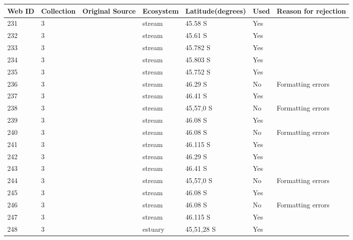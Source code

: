 \documentclass[12pt]{article}
\begin{document}
\begin{landscape}
        \newpage

    \begin{table}[h!]
    \centering
    {\footnotesize
      \begin{tabular}{p{2.8cm}p{1.3cm}p{3cm}p{2.2cm}p{2.5cm}lp{8.2cm}}
        \hline
        Web ID & Collection & Original Source & Ecosystem & Latitude(degrees) & Used  & Reason for rejection  \\
        \hline
        231   & 3 & \cite{Thompson2004c}  & stream & 45.58 S & Yes   &       \\
        232   & 3 & \cite{Thompson2004c}  & stream & 45.61 S & Yes   &       \\
        233   & 3 & \cite{Thompson2004c}  & stream & 45.782 S & Yes   &       \\
        234   & 3 & \cite{Thompson2004c}  & stream & 45.803 S & Yes   &       \\
        235   & 3 & \cite{Thompson2004c}  & stream & 45.752 S & Yes   &       \\
        236   & 3 & \cite{Thompson2004c}  & stream & 46.29 S & No  &  Formatting errors     \\
        237   & 3 & \cite{Thompson2004c}  & stream & 46.41 S & Yes   &       \\
        238   & 3 & \cite{Thompson2004c}  & stream & 45,57,0 S & No  &  Formatting errors     \\
        239   & 3 & \cite{Thompson2004c}  & stream & 46.08 S & Yes   &       \\
        240   & 3 & \cite{Thompson2004c}  & stream & 46.08 S & No  &  Formatting errors     \\
        241   & 3 & \cite{Thompson2004c}  & stream & 46.115 S & Yes   &       \\
        242   & 3 & \cite{Thompson2004c}  & stream & 46.29 S & Yes   &       \\
        243   & 3 & \cite{Thompson2004c}  & stream & 46.41 S & Yes   &       \\
        244   & 3 & \cite{Thompson2004c}  & stream & 45,57,0 S & No  &  Formatting errors     \\
        245   & 3 & \cite{Thompson2004c}  & stream & 46.08 S & Yes   &       \\
        246   & 3 & \cite{Thompson2004c}  & stream & 46.08 S & No  &  Formatting errors     \\
        247   & 3 & \cite{Thompson2004c}  & stream & 46.115 S & Yes   &       \\
        248   & 3 & \cite{Thompson2004}  & estuary & 45,51,28 S & Yes   &        \\

\end{tabular}}
\end{table}
\end{landscape}
\end{document}
